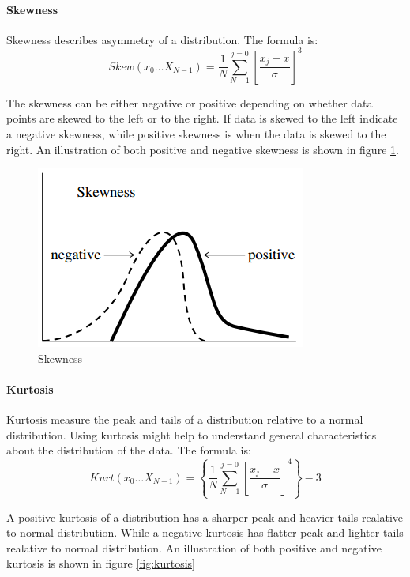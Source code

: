 \documentclass[USenglish]{ifimaster}  %
\begin{document}
\paragraph{Skewness} 
Skewness describes asymmetry of a distribution. The formula is\cite{Press:2007:NRE:1403886}:
\begin{equation}
Skew(x_0\dotsc X_{N-1})  =  \frac{1}{N}\sum_{N-1}^{j=0}\left [ \frac{x_j-\bar{x}}{\sigma} \right ]^3
\label{eq:skew}
\end{equation}

The skewness can be either negative or positive depending on whether data points are skewed to the left or to the right. If data is skewed to the left indicate a negative skewness, while positive skewness is when the data is skewed to the right. An illustration of both positive and negative skewness is shown in figure \ref{fig:skew}.

\begin{figure}[h]
	\centering
	\includegraphics[scale=0.8]{Figures/Skewness}
	\caption{Skewness}
	\label{fig:skew}
\end{figure}

\FloatBarrier

\paragraph{Kurtosis}
Kurtosis measure the peak and tails of a distribution relative to a normal distribution. Using kurtosis might help to understand general characteristics about the distribution of the data. The formula is\cite{Press:2007:NRE:1403886}:
\begin{equation}
Kurt(x_0\dotsc X_{N-1}) = \left \{ \frac{1}{N}\sum_{N-1}^{j=0}\left [ \frac{x_j-\bar{x}}{\sigma} \right ]^4 \right \}-3
\label{eq:kurtosis}
\end{equation}

A positive kurtosis of a distribution has a sharper peak and heavier tails realative to normal distribution. While a negative kurtosis has flatter peak and lighter tails realative to normal distribution. An illustration of both positive and negative kurtosis is shown in figure \ref{fig:kurtosis}
\end{document}
